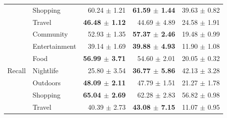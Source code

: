\begin{table}[htbp]
\begin{tabular}{llrrr}
                           & Shopping      & 60.24 $\pm$ 1.21          & \textbf{61.59 $\pm$ 1.44} & 39.63 $\pm$ 0.82 \\
                           & Travel        & \textbf{46.48 $\pm$ 1.12} & 44.69 $\pm$ 4.89          & 24.58 $\pm$ 1.91 \\
\midrule
\multirow{7}{*}{Recall}    & Community     & 52.93 $\pm$ 1.35          & \textbf{57.37 $\pm$ 2.46} & 19.48 $\pm$ 0.99 \\
                           & Entertainment & 39.14 $\pm$ 1.69          & \textbf{39.88 $\pm$ 4.93} & 11.90 $\pm$ 1.08 \\
                           & Food          & \textbf{56.99 $\pm$ 3.71} & 54.60 $\pm$ 2.01          & 20.05 $\pm$ 0.32 \\
                           & Nightlife     & 25.80 $\pm$ 3.54          & \textbf{36.77 $\pm$ 5.86} & 42.13 $\pm$ 3.28 \\
                           & Outdoors      & \textbf{48.09 $\pm$ 2.11} & 47.79 $\pm$ 1.51          & 21.27 $\pm$ 1.78 \\
                           & Shopping      & \textbf{65.04 $\pm$ 2.69} & 62.28 $\pm$ 2.83          & 56.82 $\pm$ 0.98 \\
                           & Travel        & 40.39 $\pm$ 2.73          & \textbf{43.08 $\pm$ 7.15} & 11.07 $\pm$ 0.95 \\
\bottomrule
\end{tabular}
\end{table}
